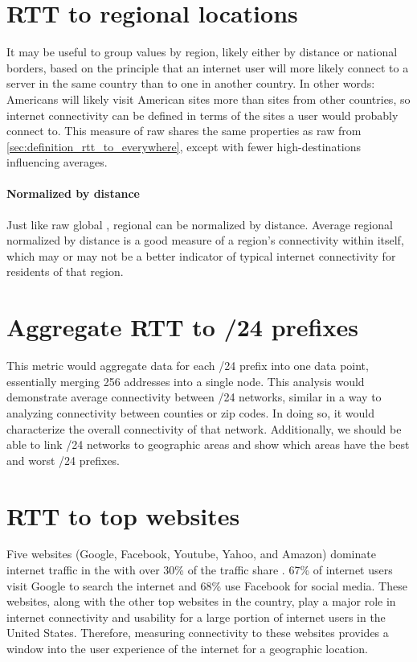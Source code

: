 \section{RTT to regional locations}

It may be useful to group \rtt values by region, likely either by distance or national borders, based on the principle that an internet user will more likely connect to a server in the same country than to one in another country. In other words: Americans will likely visit American sites more than sites from other countries, so internet connectivity can be defined in terms of the sites a user would probably connect to. This measure of raw \rtt shares the same properties as raw \rtt from \cref{sec:definition_rtt_to_everywhere}, except with fewer high-\rtt destinations influencing averages.

\paragraph{Normalized by distance}
Just like raw global \rtts, regional \rtts can be normalized by distance. Average regional \rtt normalized by distance is a good measure of a region's connectivity within itself, which may or may not be a better indicator of typical internet connectivity for residents of that region.

\section{Aggregate RTT to /24 prefixes}

This metric would aggregate data for each /24 prefix into one data point, essentially merging 256 \ip addresses into a single node. This analysis would demonstrate average connectivity between /24 networks, similar in a way to analyzing connectivity between counties or zip codes. In doing so, it would characterize the overall connectivity of that network. Additionally, we should be able to link /24 networks to geographic areas and show which areas have the best and worst /24 prefixes.

\section{RTT to top websites}
Five websites (Google, Facebook, Youtube, Yahoo, and Amazon) dominate internet traffic in the \us with over 30\% of the traffic share \cite{Tachalova2017}. 67\% of \us internet users visit Google to search the internet and 68\% use Facebook for social media. These websites, along with the other top websites in the country, play a major role in internet connectivity and usability for a large portion of internet users in the United States. Therefore, measuring connectivity to these websites provides a window into the user experience of the internet for a geographic location.

